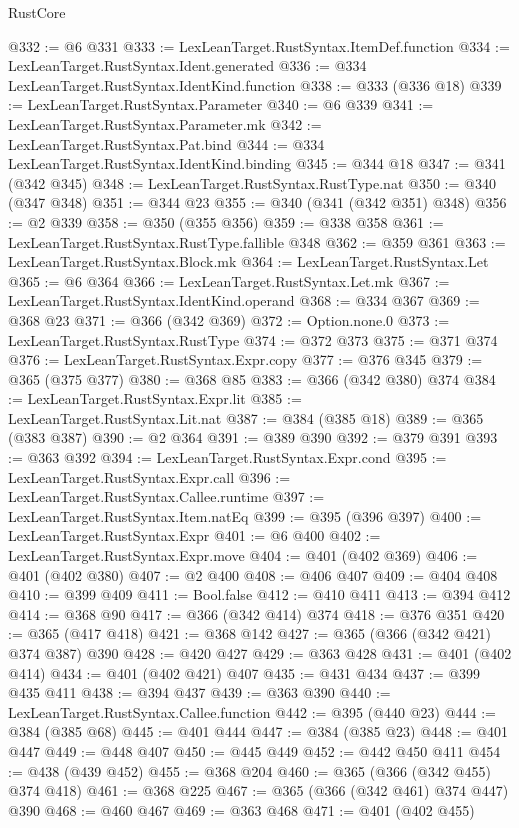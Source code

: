 \begin{lexlean}{RustCore}
\begin{coremodule}
@332 := @6 @331
@333 := LexLeanTarget.RustSyntax.ItemDef.function
@334 := LexLeanTarget.RustSyntax.Ident.generated
@336 := @334 LexLeanTarget.RustSyntax.IdentKind.function
@338 := @333 (@336 @18)
@339 := LexLeanTarget.RustSyntax.Parameter
@340 := @6 @339
@341 := LexLeanTarget.RustSyntax.Parameter.mk
@342 := LexLeanTarget.RustSyntax.Pat.bind
@344 := @334 LexLeanTarget.RustSyntax.IdentKind.binding
@345 := @344 @18
@347 := @341 (@342 @345)
@348 := LexLeanTarget.RustSyntax.RustType.nat
@350 := @340 (@347 @348)
@351 := @344 @23
@355 := @340 (@341 (@342 @351) @348)
@356 := @2 @339
@358 := @350 (@355 @356)
@359 := @338 @358
@361 := LexLeanTarget.RustSyntax.RustType.fallible @348
@362 := @359 @361
@363 := LexLeanTarget.RustSyntax.Block.mk
@364 := LexLeanTarget.RustSyntax.Let
@365 := @6 @364
@366 := LexLeanTarget.RustSyntax.Let.mk
@367 := LexLeanTarget.RustSyntax.IdentKind.operand
@368 := @334 @367
@369 := @368 @23
@371 := @366 (@342 @369)
@372 := Option.none.{0}
@373 := LexLeanTarget.RustSyntax.RustType
@374 := @372 @373
@375 := @371 @374
@376 := LexLeanTarget.RustSyntax.Expr.copy
@377 := @376 @345
@379 := @365 (@375 @377)
@380 := @368 @85
@383 := @366 (@342 @380) @374
@384 := LexLeanTarget.RustSyntax.Expr.lit
@385 := LexLeanTarget.RustSyntax.Lit.nat
@387 := @384 (@385 @18)
@389 := @365 (@383 @387)
@390 := @2 @364
@391 := @389 @390
@392 := @379 @391
@393 := @363 @392
@394 := LexLeanTarget.RustSyntax.Expr.cond
@395 := LexLeanTarget.RustSyntax.Expr.call
@396 := LexLeanTarget.RustSyntax.Callee.runtime
@397 := LexLeanTarget.RustSyntax.Item.natEq
@399 := @395 (@396 @397)
@400 := LexLeanTarget.RustSyntax.Expr
@401 := @6 @400
@402 := LexLeanTarget.RustSyntax.Expr.move
@404 := @401 (@402 @369)
@406 := @401 (@402 @380)
@407 := @2 @400
@408 := @406 @407
@409 := @404 @408
@410 := @399 @409
@411 := Bool.false
@412 := @410 @411
@413 := @394 @412
@414 := @368 @90
@417 := @366 (@342 @414) @374
@418 := @376 @351
@420 := @365 (@417 @418)
@421 := @368 @142
@427 := @365 (@366 (@342 @421) @374 @387) @390
@428 := @420 @427
@429 := @363 @428
@431 := @401 (@402 @414)
@434 := @401 (@402 @421) @407
@435 := @431 @434
@437 := @399 @435 @411
@438 := @394 @437
@439 := @363 @390
@440 := LexLeanTarget.RustSyntax.Callee.function
@442 := @395 (@440 @23)
@444 := @384 (@385 @68)
@445 := @401 @444
@447 := @384 (@385 @23)
@448 := @401 @447
@449 := @448 @407
@450 := @445 @449
@452 := @442 @450 @411
@454 := @438 (@439 @452)
@455 := @368 @204
@460 := @365 (@366 (@342 @455) @374 @418)
@461 := @368 @225
@467 := @365 (@366 (@342 @461) @374 @447) @390
@468 := @460 @467
@469 := @363 @468
@471 := @401 (@402 @455)

\end{coremodule}
\end{lexlean}
